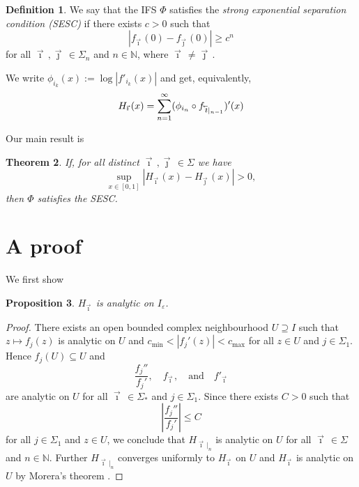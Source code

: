 \documentclass[12pt,]{article}
\newtheorem{theorem}{Theorem}[section]
\newtheorem{proposition}[theorem]{Proposition}
\theoremstyle{definition}
\newtheorem{definition}[theorem]{Definition}
\theoremstyle{remark}
\renewcommand{\Bbb}[1]{\mathbb{#1}}
\newcommand{\bbN}{{\Bbb N}}         %
\newcommand{\0}{\mathbf{0}}
\newcommand{\eps}{\varepsilon}
\newcommand{\cev}[1]{\reflectbox{\ensuremath{\vec{\reflectbox{\ensuremath{#1}}}}}}
\newcommand{\bi}{\vec{\imath}\,}
\newcommand{\bj}{\vec{\jmath}\,}
\newcommand{\bbi}{\,\cev{\imath}}
\begin{document}
\begin{definition}
  We say that the IFS $\Phi$ satisfies the \emph{strong exponential separation condition (SESC)} if
  there exists $c>0$ such that 
  \[
    |f_{\bi}(0)-f_{\bj}(0)| \geq c^n
  \]
  for all $\bi,\bj\in\Sigma_n$ and $n\in\bbN$, where $\bi\neq\bj$.
\end{definition}

We write $\phi_{i_k}(x):= \log|f'_{i_k}(x)|$ and get, equivalently,
\begin{equation}
  H_{\bi}(x) = \sum_{n=1}^\infty (\phi_{i_n}\circ f_{\bbi|_{n-1}})'(x)
  \label{eq:alternativeH}
\end{equation}

Our main result is
\begin{theorem}
  \label{thm:main}
  If, for all distinct $\bi,\bj \in\Sigma$ we have
  \[
    \sup_{x\in[0,1]} |H_{\bi}(x) - H_{\bj}(x)| > 0,
  \]
  then $\Phi$ satisfies the SESC.
\end{theorem}






\section{A proof}\label{sec:proof}
We first show
\begin{proposition}
  $H_{\bi}$ is analytic on $I_{\eps}$.
\end{proposition}
\begin{proof}
  There exists an open bounded complex neighbourhood $U \supseteq I$ such that
  $z\mapsto f_j(z)$ is analytic on $U$ and $c_{\min}<|f_j'(z)|<c_{\max}$ for all $z\in U$ and $j\in\Sigma_1$.
  Hence $f_j(U) \subseteq U$ and 
  \[
    \frac{f_j''}{f_j'},\quad f_{\bi}, \quad\text{and} \quad f'_{\bi}
  \]
  are analytic on $U$ for all $\bi\in\Sigma_*$ and $j\in\Sigma_1$.
  Since there exists $C>0$ such that 
  \[
\left|\frac{f_j''}{f_j'}\right| \leq C
  \]
  for all $j\in\Sigma_1$ and $z\in U$, we conclude that $H_{\bi|_n}$ is analytic on $U$ for
  all $\bi\in\Sigma$ and $n\in\bbN$. Further $H_{\bi|_n}$ converges uniformly to $H_{\bi}$ on $U$
and $H_{\bi}$ is analytic on $U$ by Morera's theorem \cite[Theorem 10.17]{Rudin87}.
\end{proof}
\end{document}
